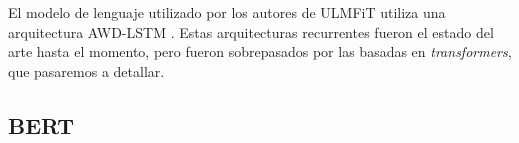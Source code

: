 El modelo de lenguaje utilizado por los autores de ULMFiT utiliza una arquitectura AWD-LSTM \cite{merity2018regularizing}. Estas arquitecturas recurrentes fueron el estado del arte hasta el momento, pero fueron sobrepasados por las basadas en \emph{transformers}, que pasaremos a detallar.



\subsection{BERT}
\label{sec:02_preliminar_bert}
